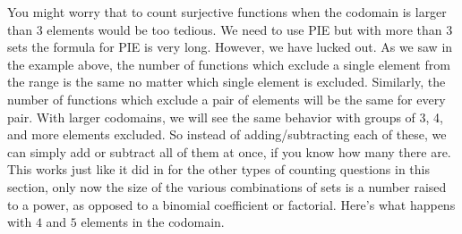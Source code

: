 \documentclass[10pt,]{book}
\theoremstyle{plain}
\theoremstyle{definition}
\theoremstyle{definition}
\theoremstyle{definition}
\theoremstyle{definition}
\numberwithin{equation}{chapter}
\begin{document}
\hypertarget{p-898}{}%
You might worry that to count surjective functions when the codomain is larger than 3 elements would be too tedious. We need to use PIE but with more than 3 sets the formula for PIE is very long. However, we have lucked out. As we saw in the example above, the number of functions which exclude a single element from the range is the same no matter which single element is excluded. Similarly, the number of functions which exclude a pair of elements will be the same for every pair. With larger codomains, we will see the same behavior with groups of 3, 4, and more elements excluded. So instead of adding/subtracting each of these, we can simply add or subtract all of them at once, if you know how many there are. This works just like it did in for the other types of counting questions in this section, only now the size of the various combinations of sets is a number raised to a power, as opposed to a binomial coefficient or factorial. Here's what happens with \(4\) and \(5\) elements in the codomain.%
\end{document}
